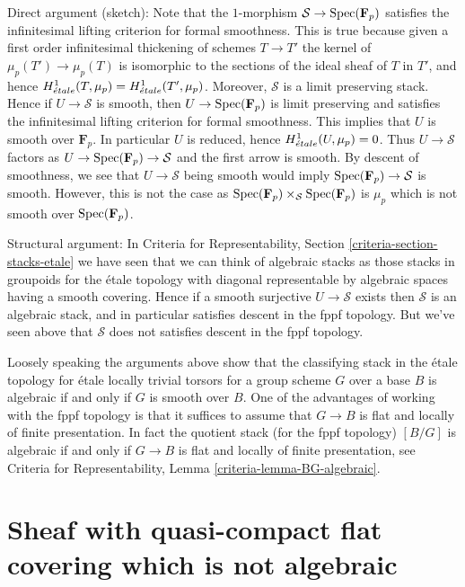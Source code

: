 \medskip\noindent
Direct argument (sketch): Note that the $1$-morphism
$\mathcal{S} \to \mathop{\mathrm{Spec}}(\mathbf{F}_p)$ satisfies the
infinitesimal lifting criterion for formal smoothness.
This is true because given a first order infinitesimal thickening
of schemes $T \to T'$ the kernel of $\mu_p(T') \to \mu_p(T)$
is isomorphic to the sections of the ideal sheaf of $T$ in $T'$, and
hence $H^1_{\acute{e}tale}(T, \mu_p) = H^1_{\acute{e}tale}(T', \mu_p)$.
Moreover, $\mathcal{S}$ is a limit preserving stack. Hence
if $U \to \mathcal{S}$ is smooth, then $U \to \mathop{\mathrm{Spec}}(\mathbf{F}_p)$
is limit preserving and satisfies  the
infinitesimal lifting criterion for formal smoothness.
This implies that $U$ is smooth over $\mathbf{F}_p$.
In particular $U$ is reduced, hence $H^1_{\acute{e}tale}(U, \mu_p) = 0$.
Thus $U \to \mathcal{S}$ factors as
$U \to \mathop{\mathrm{Spec}}(\mathbf{F}_p) \to \mathcal{S}$
and the first arrow is smooth. By descent of smoothness, we see
that $U \to \mathcal{S}$ being smooth would imply
$\mathop{\mathrm{Spec}}(\mathbf{F}_p) \to \mathcal{S}$ is smooth. However, this
is not the case as
$\mathop{\mathrm{Spec}}(\mathbf{F}_p) \times_\mathcal{S} \mathop{\mathrm{Spec}}(\mathbf{F}_p)$
is $\mu_p$ which is not smooth over $\mathop{\mathrm{Spec}}(\mathbf{F}_p)$.


\medskip\noindent
Structural argument: In
Criteria for Representability, Section \ref{criteria-section-stacks-etale}
we have seen that we can think of algebraic stacks as those
stacks in groupoids for the \'etale topology with diagonal
representable by algebraic spaces having a smooth covering.
Hence if a smooth surjective $U \to \mathcal{S}$ exists then
$\mathcal{S}$ is an algebraic stack, and in particular satisfies
descent in the fppf topology. But we've seen above that $\mathcal{S}$
does not satisfies descent in the fppf topology.

\medskip\noindent
Loosely speaking the arguments above show that the classifying
stack in the \'etale topology for \'etale locally trivial torsors
for a group scheme $G$ over a base $B$ is algebraic if and only
if $G$ is smooth over $B$. One of the advantages of working with
the fppf topology is that it suffices to assume that $G \to B$
is flat and locally of finite presentation. In fact the quotient
stack (for the fppf topology) $[B/G]$ is algebraic if and only
if $G \to B$ is flat and locally of finite presentation, see
Criteria for Representability, Lemma \ref{criteria-lemma-BG-algebraic}.







\section{Sheaf with quasi-compact flat covering which is not algebraic}
\label{section-not-algebraic}

